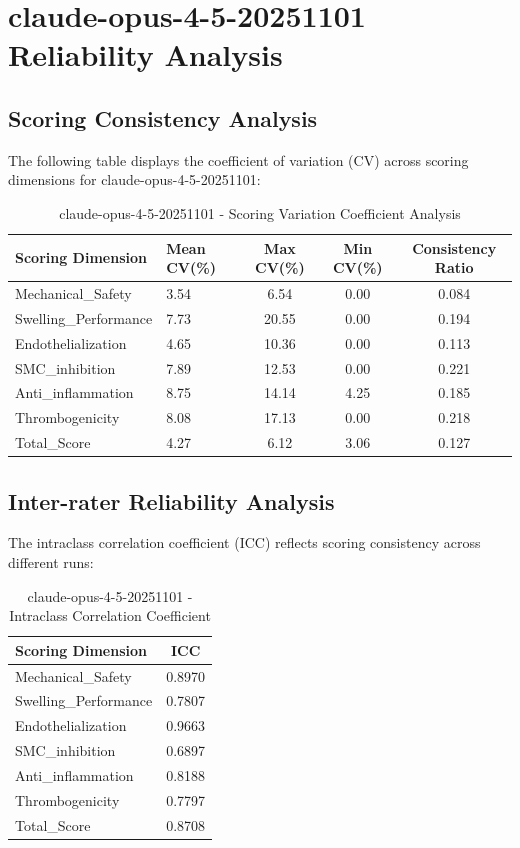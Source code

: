 \documentclass[12pt,a4paper]{article}
\begin{document}
\newpage


\section{claude-opus-4-5-20251101 Reliability Analysis}

\subsection{Scoring Consistency Analysis}

The following table displays the coefficient of variation (CV) across scoring dimensions for claude-opus-4-5-20251101:

\begin{table}[H]
\centering
\caption{claude-opus-4-5-20251101 - Scoring Variation Coefficient Analysis}
\begin{tabular}{llccc}
\toprule
\textbf{Scoring Dimension} & \textbf{Mean CV(\%)} & \textbf{Max CV(\%)} & \textbf{Min CV(\%)} & \textbf{Consistency Ratio} \\
\midrule
Mechanical\_Safety & 3.54 & 6.54 & 0.00 & 0.084 \\
Swelling\_Performance & 7.73 & 20.55 & 0.00 & 0.194 \\
Endothelialization & 4.65 & 10.36 & 0.00 & 0.113 \\
SMC\_inhibition & 7.89 & 12.53 & 0.00 & 0.221 \\
Anti\_inflammation & 8.75 & 14.14 & 4.25 & 0.185 \\
Thrombogenicity & 8.08 & 17.13 & 0.00 & 0.218 \\
Total\_Score & 4.27 & 6.12 & 3.06 & 0.127 \\
\bottomrule
\end{tabular}
\end{table}

\subsection{Inter-rater Reliability Analysis}

The intraclass correlation coefficient (ICC) reflects scoring consistency across different runs:

\begin{table}[H]
\centering
\caption{claude-opus-4-5-20251101 - Intraclass Correlation Coefficient}
\begin{tabular}{lc}
\toprule
\textbf{Scoring Dimension} & \textbf{ICC} \\
\midrule
Mechanical\_Safety & 0.8970 \\
Swelling\_Performance & 0.7807 \\
Endothelialization & 0.9663 \\
SMC\_inhibition & 0.6897 \\
Anti\_inflammation & 0.8188 \\
Thrombogenicity & 0.7797 \\
Total\_Score & 0.8708 \\
\bottomrule
\end{tabular}
\end{table}
\end{document}
